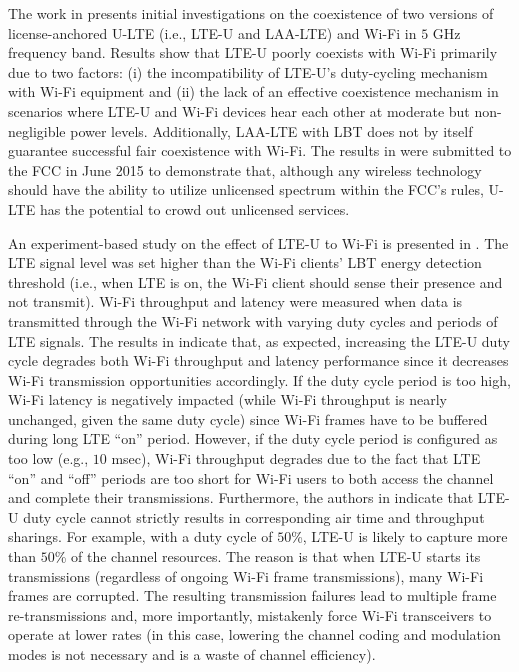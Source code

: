 The work in \cite{U-LTE-Google-WP} presents initial investigations on the coexistence of two versions of license-anchored U-LTE (i.e., LTE-U and LAA-LTE) and Wi-Fi in $5$ GHz frequency band. Results show that LTE-U poorly coexists with Wi-Fi primarily due to two factors: (i) the incompatibility of LTE-U's duty-cycling mechanism with Wi-Fi equipment and (ii) the lack of an effective coexistence mechanism in scenarios where LTE-U and Wi-Fi devices hear each other at moderate but non-negligible power levels. Additionally, LAA-LTE with LBT does not by itself guarantee successful fair coexistence with Wi-Fi. The results in \cite{U-LTE-Google-WP} were submitted to the FCC in June 2015 to demonstrate that, although any wireless technology should have the ability to utilize unlicensed spectrum within the FCC's rules, U-LTE has the potential to crowd out unlicensed services.

An experiment-based study on the effect of LTE-U to Wi-Fi is presented in \cite{LTE-U-CableLabs}. The LTE signal level was set higher than the Wi-Fi clients' LBT energy detection threshold (i.e., when LTE is on, the Wi-Fi client should sense their presence and not transmit). Wi-Fi throughput and latency were measured when data is transmitted through the Wi-Fi network with varying duty cycles and periods of LTE signals. The results in \cite{LTE-U-CableLabs} indicate that, as expected, increasing the LTE-U duty cycle degrades both Wi-Fi throughput and latency performance since it decreases Wi-Fi transmission opportunities accordingly. If the duty cycle period is too high, Wi-Fi latency is negatively impacted (while Wi-Fi throughput is nearly unchanged, given the same duty cycle) since Wi-Fi frames have to be buffered during long LTE ``on'' period. However, if the duty cycle period is configured as too low (e.g., $10$ msec), Wi-Fi throughput degrades due to the fact that LTE ``on'' and ``off'' periods are too short for Wi-Fi users to both access the channel and complete their transmissions. Furthermore, the authors in \cite{LTE-U-CableLabs} indicate that LTE-U duty cycle cannot strictly results in corresponding air time and throughput sharings. For example, with a duty cycle of $50$\%, LTE-U is likely to capture more than $50$\% of the channel resources. The reason is that when LTE-U starts its transmissions (regardless of ongoing Wi-Fi frame transmissions), many Wi-Fi frames are corrupted. The resulting transmission failures lead to multiple frame re-transmissions and, more importantly, mistakenly force Wi-Fi transceivers to operate at lower rates (in this case, lowering the channel coding and modulation modes is not necessary and is a waste of channel efficiency).


